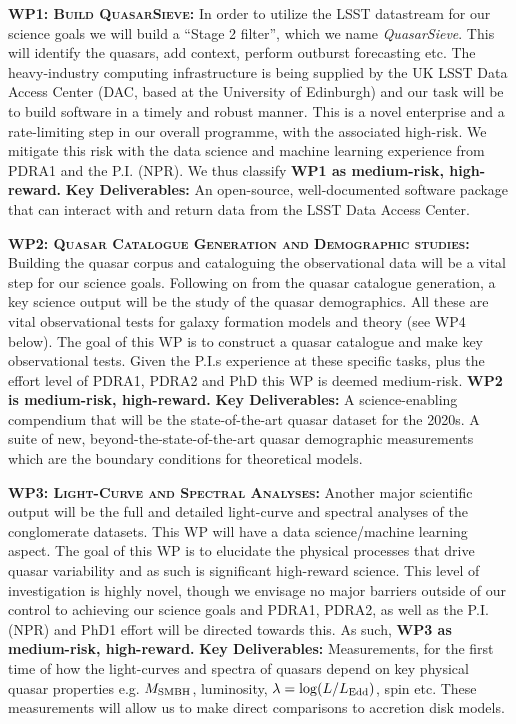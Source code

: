 \documentclass[oneside, a4paper, onecolumn, 11pt]{article}
\begin{document}
\smallskip
\smallskip
\noindent
\textbf{\textsc{WP1: Build QuasarSieve:}} 
In order to utilize the LSST datastream for our science goals we will
build a ``Stage 2 filter'', which we name {\it QuasarSieve}.  This
will identify the quasars, add context, perform outburst forecasting
etc.  The heavy-industry computing infrastructure is being supplied by
the UK LSST Data Access Center (DAC, based at the University of
Edinburgh) and our task will be to build software in a timely and
robust manner.  This is a novel enterprise and a rate-limiting step in
our overall programme, with the associated high-risk.  We mitigate
this risk with the data science and machine learning experience from
PDRA1 and the P.I. (NPR).  We thus classify {\bf WP1 as medium-risk,
high-reward.}  {\bf Key Deliverables:} An open-source, well-documented
software package that can interact with and return data from the LSST
Data Access Center.


\smallskip
\smallskip
\noindent
\textbf{\textsc{WP2: Quasar Catalogue Generation and Demographic studies:}}  
Building the quasar corpus and cataloguing the observational data will
be a vital step for our science goals.  Following on from the quasar
catalogue generation, a key science output will be the study of the
quasar demographics.  All these are vital observational tests for
galaxy formation models and theory (see WP4 below). The goal of this
WP is to construct a quasar catalogue and make key observational
tests.  Given the P.I.s experience at these specific tasks, plus the
effort level of PDRA1, PDRA2 and PhD this WP is deemed medium-risk.
{\bf WP2 is medium-risk, high-reward.}  {\bf Key Deliverables:} A
science-enabling compendium that will be the state-of-the-art quasar
dataset for the 2020s.  A suite of new, beyond-the-state-of-the-art
quasar demographic measurements which are the boundary conditions for
theoretical models.


\smallskip
\smallskip
\noindent
\textbf{\textsc{WP3: Light-Curve and Spectral Analyses:}} 
Another major scientific output will be the full and detailed light-curve
and spectral analyses of the conglomerate datasets.  This WP will have
a data science/machine learning aspect.  The goal of this WP is to
elucidate the physical processes that drive quasar variability and as
such is significant high-reward science.  This level of investigation
is highly novel, though we envisage no major barriers outside of our
control to achieving our science goals and PDRA1, PDRA2, as well as
the P.I. (NPR) and PhD1 effort will be directed towards this.  As
such, {\bf WP3 as medium-risk, high-reward.}  {\bf Key Deliverables:}
Measurements, for the first time of how the light-curves and spectra
of quasars depend on key physical quasar properties e.g. $M_{\rm
SMBH}$, luminosity, $\lambda = \log (L / L_{\rm Edd})$, spin etc.
These measurements will allow us to make direct comparisons to
accretion disk models.
\end{document}
